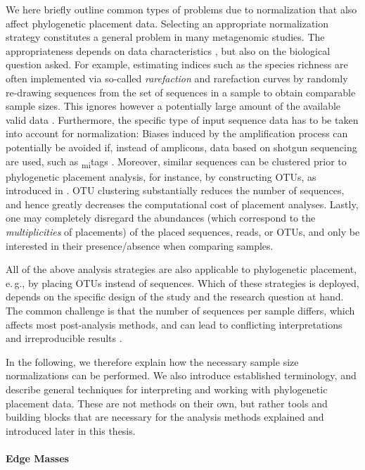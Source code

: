 We here briefly outline common types of problems due to normalization that also affect phylogenetic placement data.
Selecting an appropriate normalization strategy constitutes a general problem in many metagenomic studies.
The appropriateness depends on data characteristics \cite{Weiss2017}, but also on the biological question asked.
For example, estimating indices such as the species richness are often implemented
via so-called \emph{rarefaction} and rarefaction curves \cite{Gotelli2001}
by randomly re-drawing sequences from the set of sequences in a sample to obtain comparable sample sizes.
This ignores however a potentially large amount of the available valid data \cite{McMurdie2014}.
Furthermore, the specific type of input sequence data has to be taken into account for normalization:
Biases induced by the amplification process can potentially be avoided if, instead of amplicons,
data based on shotgun sequencing are used, such as \textsubscript{mi}tags \cite{Logares2014}.
Moreover, similar sequences can be clustered prior to phylogenetic placement analysis, for instance,
by constructing \acfp{OTU}, as introduced in .
\ac{OTU} clustering substantially reduces the number of sequences,
and hence greatly decreases the computational cost of placement analyses.
Lastly, one may completely disregard the abundances (which correspond to the \emph{multiplicities} of placements)
of the placed sequences, reads, or OTUs, and only be interested in their presence/absence when comparing samples.

All of the above analysis strategies are also applicable to phylogenetic placement,
e.\,g., by placing OTUs instead of sequences.
Which of these strategies is deployed,
depends on the specific design of the study and the research question at hand.
The common challenge is that the number of sequences per sample differs, which affects most post-analysis methods,
and can lead to conflicting interpretations and irreproducible results \cite{Gloor2016,Tsilimigras2016}.

In the following, we therefore explain how the necessary sample size normalizations can be performed.
We also introduce established terminology,
and describe general techniques for interpreting and working with phylogenetic placement data.
These are not methods on their own, but rather tools and building blocks
that are necessary for the analysis methods explained and introduced later in this thesis.

\paragraph{Edge Masses}
\label{ch:Foundations:sec:PhylogeneticPlacement:sub:PlacementProcessing:par:EdgeMasses}

